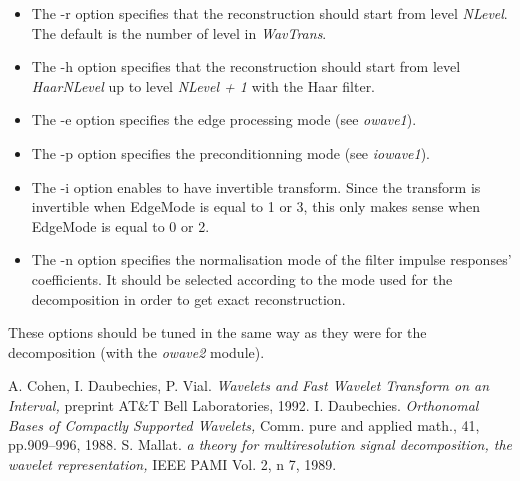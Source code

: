 \begin{itemize}
\item
The -r option specifies that the reconstruction should start from level 
{\em NLevel}. The default is the number of level in {\em WavTrans}. 
\item
The -h option specifies that the reconstruction should start from level 
{\em HaarNLevel} up to level {\em NLevel + 1} with the Haar filter. 
\item
The -e option specifies the edge processing mode (see {\em owave1}).
\item
The -p option specifies the preconditionning mode (see {\em iowave1}).
\item
The -i option enables to have invertible transform. Since the transform is invertible when EdgeMode is equal to 1 or 3, this only makes sense when EdgeMode is equal to 0 or 2. 
\item
The -n option specifies the normalisation mode of the filter impulse responses' coefficients. It should be selected according to the mode used for the decomposition in order to get exact reconstruction. 
\end{itemize}

These options should be tuned in the same way as they were 
for the decomposition (with the {\em owave2} module). 

\begin{thebibliography}{Dau1}

 A. Cohen, I. Daubechies, P. Vial. 
{\em Wavelets and Fast Wavelet Transform on an Interval, } 
preprint AT\&T Bell Laboratories, 1992.
 I. Daubechies. 
{\em Orthonomal Bases of Compactly Supported Wavelets, } 
Comm. pure and applied math., 41, pp.909--996, 1988.
 S. Mallat. {\em a theory for multiresolution signal decomposition, the wavelet representation, } IEEE PAMI Vol. 2, n 7, 1989.

\end{thebibliography}

